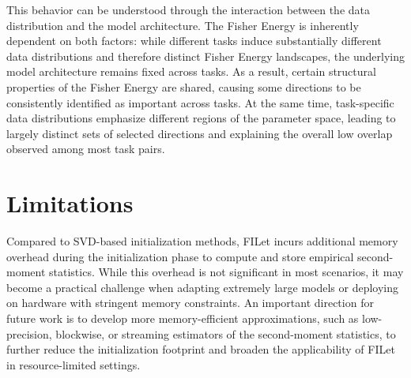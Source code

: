 \documentclass{article}
\theoremstyle{plain}
\theoremstyle{definition}
\theoremstyle{remark}
\begin{document}
This behavior can be understood through the interaction between the data distribution and the model architecture. The Fisher Energy is inherently dependent on both factors: while different tasks induce substantially different data distributions and therefore distinct Fisher Energy landscapes, the underlying model architecture remains fixed across tasks. As a result, certain structural properties of the Fisher Energy are shared, causing some directions to be consistently identified as important across tasks. At the same time, task-specific data distributions emphasize different regions of the parameter space, leading to largely distinct sets of selected directions and explaining the overall low overlap observed among most task pairs.



\section{Limitations}
\label{appendix:limitations}

Compared to SVD-based initialization methods, FILet incurs additional memory overhead during the initialization phase to compute and store empirical second-moment statistics. While this overhead is not significant in most scenarios, it may become a practical challenge when adapting extremely large models or deploying on hardware with stringent memory constraints. An important direction for future work is to develop more memory-efficient approximations, such as low-precision, blockwise, or streaming estimators of the second-moment statistics, to further reduce the initialization footprint and broaden the applicability of FILet in resource-limited settings.
\end{document}
